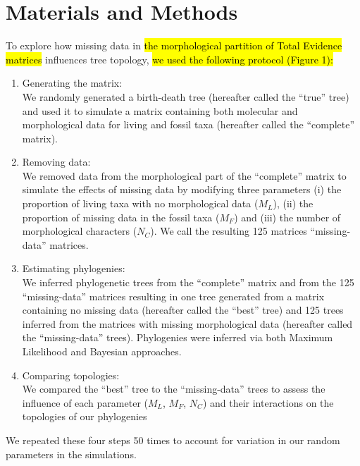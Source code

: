 \documentclass[12pt,letterpaper]{article}
\begin{document}
%
%
 
\section{Materials and Methods}
To explore how missing data in \hl{the morphological partition of Total Evidence matrices} influences tree topology, \hl{we used the following protocol (Figure 1):}
\begin{enumerate}
\item{Generating the matrix:} \label{step:generate_matrix} \\
We randomly generated a birth-death tree (hereafter called the ``true'' tree) and used it to simulate a matrix containing both molecular and morphological data for living and fossil taxa (hereafter called the ``complete'' matrix).
\item{Removing data:} \label{step:remove_data} \\
We removed data from the morphological part of the ``complete'' matrix to simulate the effects of missing data by modifying three parameters (i) the proportion of living taxa with no morphological data ($M_{L}$), (ii) the proportion of missing data in the fossil taxa ($M_{F}$) and (iii) the number of morphological characters ($N_{C}$). We call the resulting 125 matrices ``missing-data'' matrices.
\item{Estimating phylogenies:} \label{step:build_phylo} \\
We inferred phylogenetic trees from the ``complete'' matrix and from the 125 ``missing-data'' matrices resulting in one tree generated from a matrix containing no missing data (hereafter called the ``best'' tree) and 125 trees inferred from the matrices with missing morphological data (hereafter called the ``missing-data'' trees). Phylogenies were inferred via both Maximum Likelihood and Bayesian approaches.
\item{Comparing topologies:} \label{step:compare_topo} \\
We compared the ``best'' tree to the ``missing-data'' trees to assess the influence of each parameter ($M_{L}$, $M_{F}$, $N_{C}$) and their interactions on the topologies of our phylogenies
\end{enumerate}
We repeated these four steps 50 times to account for variation in our random parameters in the simulations.

\end{document}
